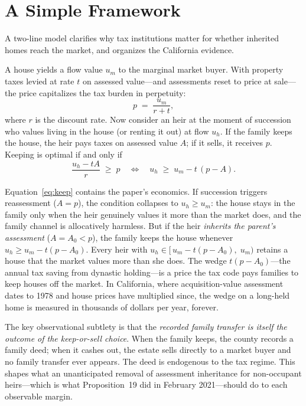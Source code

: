\documentclass[12pt, letterpaper]{article}
\begin{document}
\section{A Simple Framework}\label{sec:framework}

A two-line model clarifies why tax institutions matter for whether inherited
homes reach the market, and organizes the California evidence.

A house yields a flow value $u_m$ to the marginal market buyer. With property
taxes levied at rate $t$ on assessed value---and assessments reset to price at
sale---the price capitalizes the tax burden in perpetuity:
\begin{equation}
  p \;=\; \frac{u_m}{r + t},
\end{equation}
where $r$ is the discount rate. Now consider an heir at the moment of
succession who values living in the house (or renting it out) at flow $u_h$.
If the family keeps the house, the heir pays taxes on assessed value $A$; if
it sells, it receives $p$. Keeping is optimal if and only if
\begin{equation}
  \frac{u_h - tA}{r} \;\ge\; p
  \quad\Longleftrightarrow\quad
  u_h \;\ge\; u_m - t\,(p - A).
  \label{eq:keep}
\end{equation}

Equation~\eqref{eq:keep} contains the paper's economics. If succession
triggers reassessment ($A = p$), the condition collapses to $u_h \ge u_m$:
the house stays in the family only when the heir genuinely values it more
than the market does, and the family channel is allocatively harmless. But if
the heir \emph{inherits the parent's assessment} ($A = A_0 < p$), the family
keeps the house whenever $u_h \ge u_m - t(p - A_0)$. Every heir with
$u_h \in [\,u_m - t(p - A_0),\; u_m)$ retains a house that the market values
more than she does. The wedge $t(p - A_0)$---the annual tax saving from
dynastic holding---is a price the tax code pays families to keep houses off
the market. In California, where acquisition-value assessment dates to 1978
and house prices have multiplied since, the wedge on a long-held home is
measured in thousands of dollars per year, forever.

The key observational subtlety is that the \emph{recorded family transfer is
itself the outcome of the keep-or-sell choice}. When the family keeps, the
county records a family deed; when it cashes out, the estate sells directly
to a market buyer and no family transfer ever appears. The deed is endogenous
to the tax regime. This shapes what an unanticipated removal of assessment
inheritance for non-occupant heirs---which is what Proposition~19 did in
February 2021---should do to each observable margin.
\end{document}
